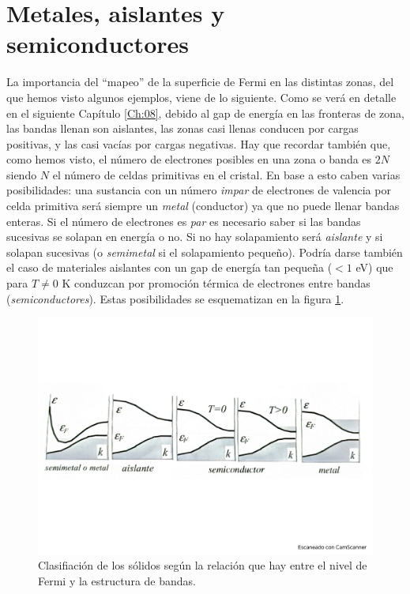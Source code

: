 \section{Metales, aislantes y semiconductores}

La importancia del ``mapeo'' de la superficie de Fermi en las distintas zonas, del que hemos visto algunos ejemplos, viene de lo siguiente. Como se verá en detalle en el siguiente Capítulo \ref{Ch:08}, debido al gap de energía en las fronteras de zona, las bandas llenan son aislantes, las zonas casi llenas conducen por cargas positivas, y las casi vacías por cargas negativas. Hay que recordar también que, como hemos visto, el número de electrones posibles en una zona o banda es $2N$ siendo $N$ el número de celdas primitivas en el cristal. En base a esto caben varias posibilidades: una sustancia con un número \textit{impar} de electrones de valencia por celda primitiva será siempre un \textit{metal} (conductor) ya que no puede llenar bandas enteras. Si el número de electrones es \textit{par} es necesario saber si las bandas sucesivas se solapan en energía o no. Si no hay solapamiento será \textit{aislante} y si solapan sucesivas (o \textit{semimetal} si el solapamiento pequeño). Podría darse también el caso de materiales aislantes con un gap de energía tan pequeña ($<1$ eV) que para $T\neq 0$ K conduzcan por promoción térmica de electrones entre bandas (\textit{semiconductores}). Estas posibilidades se esquematizan en la figura \ref{Fig:07-10}.
 
\begin{figure}[h!] \centering
    \includegraphics[scale=0.5]{Cuerpo/Ch_07/Fotos libro 10.pdf}
    \caption{Clasifiación de los sólidos según la relación que hay entre el nivel de Fermi y la estructura de bandas.}
    \label{Fig:07-10}
\end{figure}    
